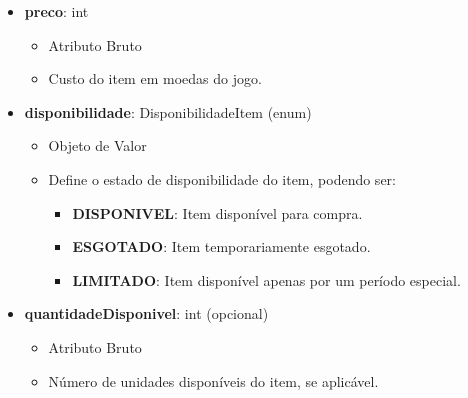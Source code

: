 \begin{itemize}
        \item \textbf{preco}: int  
              \begin{itemize}
                  \item Atributo Bruto
                  \item Custo do item em moedas do jogo.
              \end{itemize}
    
        \item \textbf{disponibilidade}: DisponibilidadeItem (enum)  
              \begin{itemize}
                  \item Objeto de Valor
                  \item Define o estado de disponibilidade do item, podendo ser:
                  \begin{itemize}
                      \item \textbf{DISPONIVEL}: Item disponível para compra.
                      \item \textbf{ESGOTADO}: Item temporariamente esgotado.
                      \item \textbf{LIMITADO}: Item disponível apenas por um período especial.
                  \end{itemize}
              \end{itemize}
    
        \item \textbf{quantidadeDisponivel}: int (opcional)  
              \begin{itemize}
                  \item Atributo Bruto
                  \item Número de unidades disponíveis do item, se aplicável.
              \end{itemize}
    \end{itemize}
